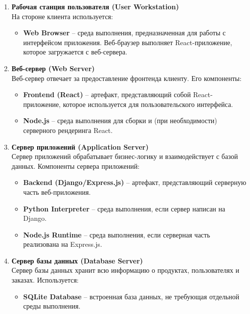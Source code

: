 \documentclass[a4paper]{report}
\begin{document}
\begin{enumerate}
    \item \textbf{Рабочая станция пользователя (User Workstation)}\\
    На стороне клиента используется:
    \begin{itemize}
        \item \textbf{Web Browser} -- среда выполнения, предназначенная для работы с интерфейсом приложения. Веб-браузер выполняет React-приложение, которое загружается с веб-сервера.
    \end{itemize}
    
    \item \textbf{Веб-сервер (Web Server)}\\
    Веб-сервер отвечает за предоставление фронтенда клиенту. Его компоненты:
    \begin{itemize}
        \item \textbf{Frontend (React)} -- артефакт, представляющий собой React-приложение, которое используется для пользовательского интерфейса.
        \item \textbf{Node.js} -- среда выполнения для сборки и (при необходимости) серверного рендеринга React.
    \end{itemize}
    
    \item \textbf{Сервер приложений (Application Server)}\\
    Сервер приложений обрабатывает бизнес-логику и взаимодействует с базой данных. Компоненты сервера приложений:
    \begin{itemize}
        \item \textbf{Backend (Django/Express.js)} -- артефакт, представляющий серверную часть веб-приложения.
        \item \textbf{Python Interpreter} -- среда выполнения, если сервер написан на Django.
        \item \textbf{Node.js Runtime} -- среда выполнения, если серверная часть реализована на Express.js.
    \end{itemize}
    
    \item \textbf{Сервер базы данных (Database Server)}\\
    Сервер базы данных хранит всю информацию о продуктах, пользователях и заказах. Используется:
    \begin{itemize}
        \item \textbf{SQLite Database} -- встроенная база данных, не требующая отдельной среды выполнения.
    \end{itemize}
    

\end{enumerate}
\end{document}
